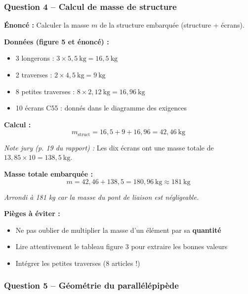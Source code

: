 \documentclass[12pt,a4paper,twoside]{article}
\begin{document}
\subsubsection{Question 4 -- Calcul de masse de structure}

\begin{correction}
  \textbf{Énoncé :} Calculer la masse $m$ de la structure embarquée (structure + écrans).

  \textbf{Données (figure 5 et énoncé) :}
  \begin{itemize}
    \item 3 longerons : $3 \times 5,5~\text{kg} = 16,5~\text{kg}$
    \item 2 traverses : $2 \times 4,5~\text{kg} = 9~\text{kg}$
    \item 8 petites traverses : $8 \times 2,12~\text{kg} = 16,96~\text{kg}$
    \item 10 écrans C55 : donnés dans le diagramme des exigences
  \end{itemize}

  \textbf{Calcul :}
  \[
    m_{\text{struct}} = 16,5 + 9 + 16,96 = 42,46~\text{kg}
  \]

  \textit{Note jury (p. 19 du rapport) :} Les dix écrans ont une masse totale de $13,85 \times 10 = 138,5~\text{kg}$.

  \textbf{Masse totale embarquée :}
  \[
    m = 42,46 + 138,5 = 180,96~\text{kg} \approx 181~\text{kg}
  \]

  \textit{Arrondi à 181 kg car la masse du pont de liaison est négligeable.}
\end{correction}

\begin{methode}
  \textbf{Pièges à éviter :}
  \begin{itemize}
    \item Ne pas oublier de multiplier la masse d'un élément par sa \textbf{quantité}
    \item Lire attentivement le tableau figure 3 pour extraire les bonnes valeurs
    \item Intégrer les petites traverses (8 articles !)
  \end{itemize}
\end{methode}

\subsubsection{Question 5 -- Géométrie du parallélépipède}
\end{document}
